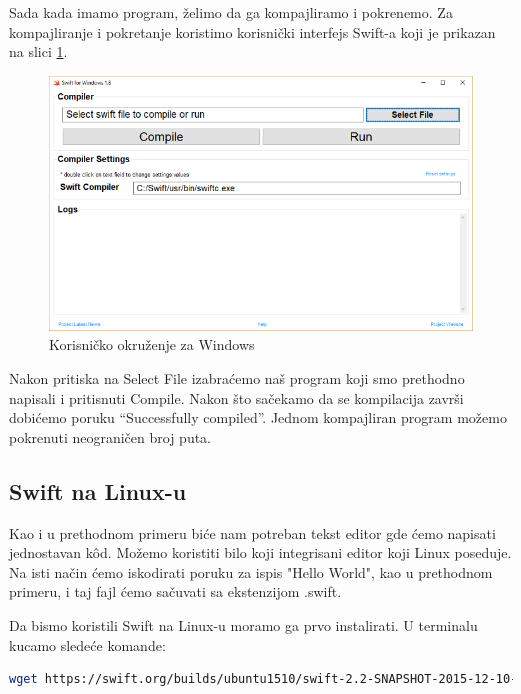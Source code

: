 \documentclass[a4paper]{article}
\begin{document}
Sada kada imamo program, želimo da ga kompajliramo i pokrenemo. Za kompajliranje i pokretanje koristimo korisnički interfejs Swift-a koji je prikazan na slici \ref{fig:windows}.

\begin{figure}[h!]
\begin{center}
\includegraphics[scale=0.35]{swift-win.png}
\end{center}
\caption{Korisničko okruženje za Windows}
\label{fig:windows}
\end{figure}

Nakon pritiska na Select File izabraćemo naš program koji smo prethodno napisali i pritisnuti Compile. Nakon što sačekamo da se kompilacija završi dobićemo poruku “Successfully compiled”.
Jednom kompajliran program možemo pokrenuti neograničen broj puta.

\subsection{Swift na Linux-u}
\label{subsec:podnaslovLinux}
Kao i u prethodnom primeru biće nam potreban tekst editor gde ćemo napisati jednostavan k\^{o}d.
Možemo koristiti bilo koji integrisani editor koji Linux poseduje. Na isti način ćemo iskodirati poruku za ispis "Hello World", kao u prethodnom primeru, i taj fajl ćemo sačuvati sa ekstenzijom .swift.

Da bismo koristili Swift na Linux-u moramo ga prvo instalirati. U terminalu kucamo sledeće komande:

\begin{lstlisting}[language=bash, caption={Instaliranje Swift-a}]
	wget https://swift.org/builds/ubuntu1510/swift-2.2-SNAPSHOT-2015-12-10-a/swift-2.2-SNAPSHOT-2015-12-10-a-ubuntu15.10.tar.gz
\end{lstlisting}
\end{document}
